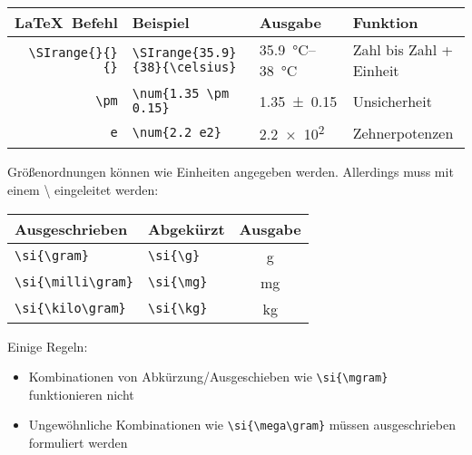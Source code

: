 \begin{frame}[fragile]
	\begin{center}
		\begin{tabular}{r|ll|l}
			\toprule
			\LaTeX\ Befehl				& Beispiel		&Ausgabe	&	Funktion								\\ \midrule
			\lstinline|\SIrange{}{}{}|	&	\lstinline|\SIrange{35.9}{38}{\celsius}| & \SIrange{35.9}{38}{\celsius}			&	Zahl bis Zahl + Einheit				\\
			\lstinline/\pm/			&	\lstinline|\num{1.35 \pm 0.15}|	& \num{1.35 \pm 0.15}				&	 Unsicherheit					\\
			\lstinline/e/			&	\lstinline|\num{2.2 e2}|& \num{2.2 e2}					&	 Zehnerpotenzen					\\
			\bottomrule
		\end{tabular}
	\end{center}
		Größenordnungen können wie Einheiten angegeben werden. Allerdings muss mit einem {\textbackslash} eingeleitet werden:
	\begin{center}
		\begin{tabular}{ll|c}
			\toprule
			Ausgeschrieben						& Abgekürzt						& Ausgabe				\\ \midrule
			\lstinline/\si{\gram}/				&	\lstinline|\si{\g}|			& \si{\gram}			\\
			\lstinline/\si{\milli\gram}/				&	\lstinline|\si{\mg}|			& \si{\mg}			\\
			\lstinline/\si{\kilo\gram}/				&	\lstinline|\si{\kg}|			& \si{\kg} 		\\
			\bottomrule
		\end{tabular}
	\end{center}
Einige Regeln: 
\begin{itemize}
	\item Kombinationen von Abkürzung/Ausgeschieben wie \lstinline|\si{\mgram}| funktionieren nicht
	\item Ungewöhnliche Kombinationen wie \lstinline|\si{\mega\gram}| müssen ausgeschrieben formuliert werden 
\end{itemize}

\end{frame}
